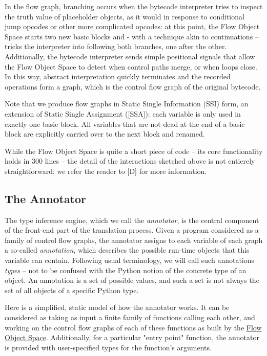 \documentclass{acm_proc_article-sp}
\begin{document}
In the flow graph, branching occurs when the bytecode interpreter tries
to inspect the truth value of placeholder objects, as it would in
response to conditional jump opcodes or other more complicated opcodes:
at this point, the Flow Object Space starts two new basic blocks and -
with a technique akin to continuations -- tricks the interpreter into
following both branches, one after the other.  Additionally, the
bytecode interpreter sends simple positional signals that allow the Flow
Object Space to detect when control paths merge, or when loops close.
In this way, abstract interpretation quickly terminates and the recorded
operations form a graph, which is the control flow graph of the original
bytecode.

Note that we produce flow graphs in Static Single Information (SSI)
form, an extension of Static Single Assignment ([SSA]): each variable is
only used in exactly one basic block.  All variables that are not dead
at the end of a basic block are explicitly carried over to the next
block and renamed.

While the Flow Object Space is quite a short piece of code -- its core
functionality holds in 300 lines -- the detail of the interactions
sketched above is not entierely straightforward; we refer the reader to
[D] for more information.


\subsection{The Annotator}

The type inference engine, which we call the \textit{annotator}, is the central
component of the front-end part of the translation process.  Given a
program considered as a family of control flow graphs, the annotator
assigns to each variable of each graph a so-called \textit{annotation}, which
describes the possible run-time objects that this variable can contain.
Following usual terminology, we will call such annotations \textit{types} -- not
to be confused with the Python notion of the concrete type of an object.
An annotation is a set of possible values, and such a set is not always
the set of all objects of a specific Python type.

Here is a simplified, static model of how the annotator works.  It can
be considered as taking as input a finite family of functions calling
each other, and working on the control flow graphs of each of these
functions as built by the \href{flowobjspace}{Flow Object Space}.
Additionally, for a particular "entry point" function, the annotator
is provided with user-specified types for the function's arguments.
\end{document}
